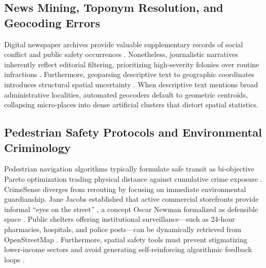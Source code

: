 \documentclass[conference]{IEEEtran}
\begin{document}
\subsection{News Mining, Toponym Resolution, and Geocoding Errors}
Digital newspaper archives provide valuable supplementary records of social conflict and public safety occurrences \cite{gerber2014predicting, umair2020spatiotemporal}. Nonetheless, journalistic narratives inherently reflect editorial filtering, prioritizing high-severity felonies over routine infractions \cite{earl2004use}. Furthermore, geoparsing descriptive text to geographic coordinates introduces structural spatial uncertainty \cite{gritta2020pragmatic, zandbergen2009geocoding}. When descriptive text mentions broad administrative localities, automated geocoders default to geometric centroids, collapsing micro-places into dense artificial clusters that distort spatial statistics.

\subsection{Pedestrian Safety Protocols and Environmental Criminology}
Pedestrian navigation algorithms typically formulate safe transit as bi-objective Pareto optimization trading physical distance against cumulative crime exposure \cite{galbrun2014safe}. CrimeSense diverges from rerouting by focusing on immediate environmental guardianship. Jane Jacobs established that active commercial storefronts provide informal ``eyes on the street'' \cite{jacobs1961death}, a concept Oscar Newman formalized as defensible space \cite{newman1972defensible}. Public shelters offering institutional surveillance---such as 24-hour pharmacies, hospitals, and police posts---can be dynamically retrieved from OpenStreetMap \cite{haklay2008openstreetmap}. Furthermore, spatial safety tools must prevent stigmatizing lower-income sectors \cite{lum2016predict, richardson2019dirty} and avoid generating self-reinforcing algorithmic feedback loops \cite{ensign2018runaway}.
\end{document}
